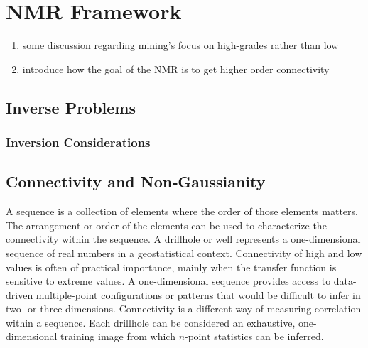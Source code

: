 
\chapter{NMR Framework}
\label{ch:03framework}

\begin{enumerate}
    \item some discussion regarding mining's focus on high-grades rather than low
    \item introduce how the goal of the NMR is to get higher order connectivity
\end{enumerate}



\FloatBarrier
\section{Inverse Problems}
\label{sec:03inverse}

\subsection{Inversion Considerations}
\label{subsec:03invconsider}


\FloatBarrier
\section{Connectivity and Non‐Gaussianity}
\label{sec:03connect}

A sequence is a collection of elements where the order of those elements matters. The arrangement or order of the elements can be used to characterize the connectivity within the sequence. A drillhole or well represents a one-dimensional sequence of real numbers in a geostatistical context. Connectivity of high and low values is often of practical importance, mainly when the transfer function is sensitive to extreme values. A one-dimensional sequence provides access to data-driven multiple-point configurations or patterns that would be difficult to infer in two- or three-dimensions. Connectivity is a different way of measuring correlation within a sequence. Each drillhole can be considered an exhaustive, one-dimensional training image from which $n\text{-point}$ statistics can be inferred.

